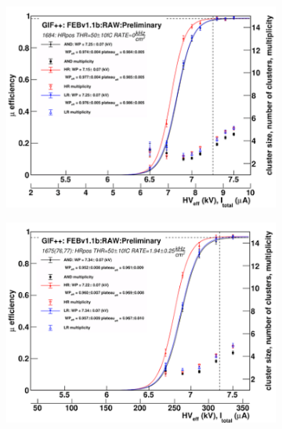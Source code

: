 	\begin{figure}[H]
		\begin{subfigure}{.5\linewidth}
		    \centering
			\includegraphics[width = \linewidth]{fig/chapt6/iRPC-RPCROC-GIFpp-SourceOFF.png}
			\caption{\label{fig:RPCROCv1_Res:A}}
		\end{subfigure}
		\begin{subfigure}{.5\linewidth}
		    \centering
			\includegraphics[width = \linewidth]{fig/chapt6/iRPC-RPCROC-GIFpp-SourceON-2kHz.png}
			\caption{\label{fig:RPCROCv1_Res:B}}
		\end{subfigure}
		\begin{subfigure}{.5\linewidth}
		    \centering

\end{subfigure}
\end{figure}

